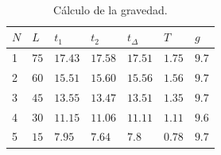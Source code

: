 \begin{table}[H]
	\centering
	\parbox{10cm}{%
		\caption{Cálculo de la gravedad.}\label{tab:02}}\\
	\begin{tabular}{C{0.5cm}C{1cm}C{1cm}C{1cm}C{1cm}C{1cm}C{1cm}}
		\hline
		 $N$ & $L$  & $t_1$   & $t_2$   & $t_\Delta$ & $T$    & $g$   \\
		                      & $75$ & $17.43$ & $17.58$ & $17.51$    & $1.75$ & $9.7$ \\
		2                      & $60$ & $15.51$ & $15.60$ & $15.56$    & $1.56$ & $9.7$ \\
		3                      & $45$ & $13.55$ & $13.47$ & $13.51$    & $1.35$ & $9.7$ \\
		4                      & $30$ & $11.15$ & $11.06$ & $11.11$    & $1.11$ & $9.6$ \\
		5                      & $15$ & $ 7.95$ & $ 7.64$ & $ 7.8$     & $0.78$ & $9.7$ \\
		\midrule
	\end{tabular}
\end{table}
